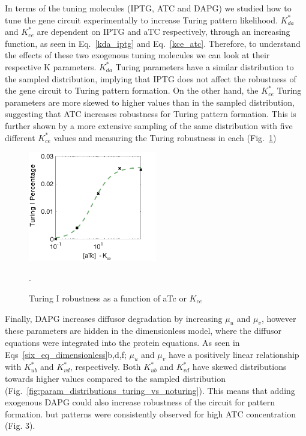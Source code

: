 In terms of the tuning molecules (IPTG, ATC and DAPG)
we studied how to tune the gene circuit experimentally to increase Turing pattern likelihood.
$K_{da}^*$  and $K_{ce}^*$ are dependent on IPTG and aTC respectively, through an increasing function,
as seen in Eq.~\ref{kda_iptg} and Eq.~\ref{kce_atc}.
Therefore,
to understand the effects of these two exogenous tuning molecules we can look at their respective K parameters.
$K_{da}^*$ Turing parameters have a similar distribution to the sampled distribution,
implying that IPTG does not affect the robustness of the gene circuit to Turing pattern formation.
On the other hand, the $K_{ce}^*$ Turing parameters are more skewed to higher values than in the sampled distribution,
suggesting that ATC increases robustness for Turing pattern formation.
This is further shown by a more extensive sampling of the same distribution with five different $K_{ce}^*$ values
and measuring the Turing robustness in each
(Fig.~\ref{fig:atc_robustness})

\begin{figure}[H] %
    \centering
    \begin{adjustbox}{center}
        \includegraphics[width=0.5\textwidth]{chapters/Chapter 2/atc_robustness} %
    \end{adjustbox}
    \caption{Turing I robustness as a function of aTc or $K_{ce}$}.
    \label{fig:atc_robustness} %
\end{figure}

Finally, DAPG increases diffusor degradation by increasing $\mu_u$ and $\mu_v$,
however these parameters are hidden in the dimensionless model,
where the diffusor equations were integrated into the protein equations.
As seen in Eqs~\ref{six_eq_dimensionless}b,d,f; $\mu_u$
and $\mu_v$ have a positively linear relationship with $K_{ub}^*$ and $K_{vd}^*$, respectively.
Both $K_{ub}^*$ and $K_{vd}^*$ have skewed distributions towards higher values compared to the sampled distribution
(Fig.~\ref{fig:param_distributions_turing_vs_noturing}).
This means that adding exogenous DAPG could also increase robustness of the circuit for pattern formation.
but patterns were consistently observed for high ATC concentration (Fig. 3).

